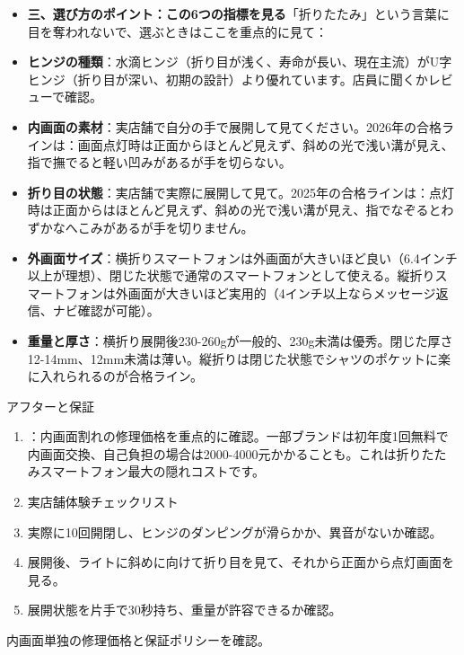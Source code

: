 \begin{itemize}
  \item \textbf{三、選び方のポイント：この6つの指標を見る}「折りたたみ」という言葉に目を奪われないで、選ぶときはここを重点的に見て：
  \item \textbf{ヒンジの種類}：水滴ヒンジ（折り目が浅く、寿命が長い、現在主流）がU字ヒンジ（折り目が深い、初期の設計）より優れています。店員に聞くかレビューで確認。
  \item \textbf{内画面の素材}：実店舗で自分の手で展開して見てください。2026年の合格ラインは：画面点灯時は正面からほとんど見えず、斜めの光で浅い溝が見え、指で撫でると軽い凹みがあるが手を切らない。
  \item \textbf{折り目の状態}：実店舗で実際に展開して見て。2025年の合格ラインは：点灯時は正面からはほとんど見えず、斜めの光で浅い溝が見え、指でなぞるとわずかなへこみがあるが手を切りません。
  \item \textbf{外画面サイズ}：横折りスマートフォンは外画面が大きいほど良い（6.4インチ以上が理想）、閉じた状態で通常のスマートフォンとして使える。縦折りスマートフォンは外画面が大きいほど実用的（4インチ以上ならメッセージ返信、ナビ確認が可能）。
  \item \textbf{重量と厚さ}：横折り展開後230-260gが一般的、230g未満は優秀。閉じた厚さ12-14mm、12mm未満は薄い。縦折りは閉じた状態でシャツのポケットに楽に入れられるのが合格ライン。
\end{itemize}

\begin{tcbpractice}{アフターと保証}
\begin{enumerate}
  \item ：内画面割れの修理価格を重点的に確認。一部ブランドは初年度1回無料で内画面交換、自己負担の場合は2000-4000元かかることも。これは折りたたみスマートフォン最大の隠れコストです。
  \item 実店舗体験チェックリスト
  \item 実際に10回開閉し、ヒンジのダンピングが滑らかか、異音がないか確認。
  \item 展開後、ライトに斜めに向けて折り目を見て、それから正面から点灯画面を見る。
  \item 展開状態を片手で30秒持ち、重量が許容できるか確認。
\end{enumerate}

\end{tcbpractice}


内画面単独の修理価格と保証ポリシーを確認。

